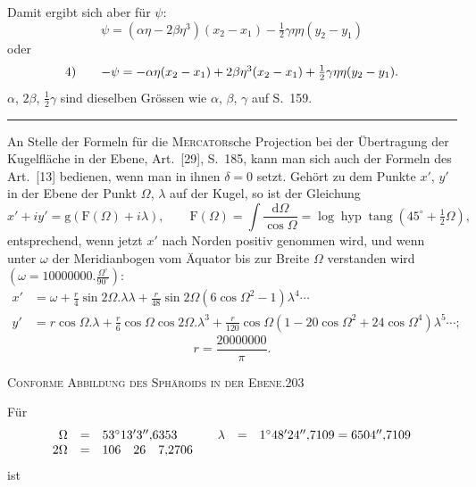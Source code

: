 Damit ergibt sich aber für $\psi$:
\[
\psi=(\alpha\eta-2\beta\eta^3)(x_2-x_1)-\tfrac12\gamma\eta\eta(y_2-y_1)
\]
oder
\[
\begin{array}{r@{\qquad}l}
4)&-\psi=-\alpha\eta(x_2-x_1)+2\beta\eta^3(x_2-x_1)+\tfrac12\gamma\eta\eta(y_2-y_1).
\end{array}
\]
$\alpha$, $2\beta$, $\tfrac12\gamma$ sind dieselben Grössen wie $\alpha$, $\beta$, $\gamma$ auf S.~159.
\begin{center}\rule{4cm}{.4pt}\end{center}
\bigskip
An Stelle der Formeln für die \textsc{Mercator}sche Projection bei der Übertragung der Kugelfläche in der Ebene, Art.~[29], S.~185, kann man sich auch der Formeln des Art.~[13] bedienen, wenn man in ihnen $\delta=0$ setzt. Gehört zu dem Punkte $x'$, $y'$ in der Ebene der Punkt $\Omega$, $\lambda$ auf der Kugel, so ist der Gleichung
\[
x'+iy'=\mathrm g(\mathrm F(\Omega)+i\lambda),\qquad
\mathrm F(\Omega)=\int\frac{\mathrm d\Omega}{\cos\Omega}
=\log\operatorname{hyp}\operatorname{tang}(45^\circ+\tfrac12\Omega),
\]
entsprechend, wenn jetzt $x'$ nach Norden positiv genommen wird, und wenn unter $\omega$ der Meridianbogen vom Äquator bis zur Breite $\Omega$ verstanden wird $\left(\omega=10000000.\frac{\Omega^\circ}{90^\circ}\right)$:
\[
\begin{aligned}
x'&=\omega+\frac r4\sin2\Omega.\lambda\lambda+\frac r{48}\sin2\Omega(6\cos\Omega^2-1)\lambda^4\cdots\\
y'&=r\cos\Omega.\lambda+\frac r6\cos\Omega\cos2\Omega.\lambda^3
+\frac r{120}\cos\Omega(1-20\cos\Omega^2+24\cos\Omega^4)\lambda^5\cdots;
\end{aligned}
\]
\[
r=\frac{20000000}{\pi}.
\]
\par\endgroup
\clearpage
\noindent\mbox{}\hfill\textsc{Conforme Abbildung des Sphäroids in der Ebene.}\hfill203\par\medskip
\begingroup\footnotesize
Für
\[
\begin{array}{rcl@{\qquad}rcl}
\Omega&=&53^\circ13'3''{,}6353&\lambda&=&1^\circ48'24''{,}7109=6504''{,}7109\\
2\Omega&=&106\quad26\quad7{,}2706&&&
\end{array}
\]
ist
